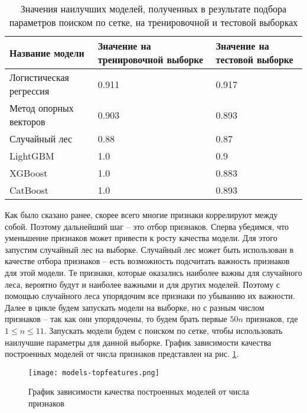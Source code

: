 \begin{table}[!htbp]
	\centering
	\small
	\begin{tabularx}{\linewidth}{|X|X|X|}
		\hline
		Название модели & Значение на тренировочной выборке & Значение на тестовой выборке\\ \hline
		Логистическая регрессия & 0.911 & 0.917 \\
		\hline 
		Метод опорных векторов & 0.903 & 0.893 \\
		\hline
		Случайный лес & 0.88 & 0.87 \\
		\hline
		LightGBM & 1.0 & 0.9 \\ %
		\hline
		XGBoost & 1.0 & 0.883 \\ %
		\hline
		CatBoost & 1.0 & 0.893 \\ 
		\hline
	\end{tabularx}
	\caption{Значения наилучших моделей, полученных в результате подбора параметров поиском по сетке, на тренировочной и тестовой выборках}	
	\label{tabl:gridsearch}
\end{table}

Как было сказано ранее, скорее всего многие признаки коррелируют между собой. Поэтому дальнейший шаг -- это отбор признаков. Сперва убедимся, что уменьшение признаков может привести к росту качества модели. Для этого запустим случайный лес на выборке. Случайный лес может быть использован в качестве отбора признаков -- есть возможность подсчитать важность признаков для этой модели. Те признаки, которые оказались наиболее важны для случайного леса, вероятно будут и наиболее важными и для других моделей. Поэтому с помощью случайного леса упорядочим все признаки по убыванию их важности. Далее в цикле будем запускать модели на выборке, но с разным числом признаков -- так как они упорядочены, то будем брать первые $50n$ признаков, где $1 \leq n \leq 11$. Запускать модели будем с поиском по сетке, чтобы использовать наилучшие параметры для данной выборке. График зависимости качества построенных моделей от числа признаков представлен на рис. \ref{accuracy-numFeatures}.

\begin{figure}[!htbp]
	\begin{center}
		\texttt{[image: models-topfeatures.png]}\\
		\caption{График зависимости качества построенных моделей от числа признаков}
		\label{accuracy-numFeatures}
	\end{center}
\end{figure}


